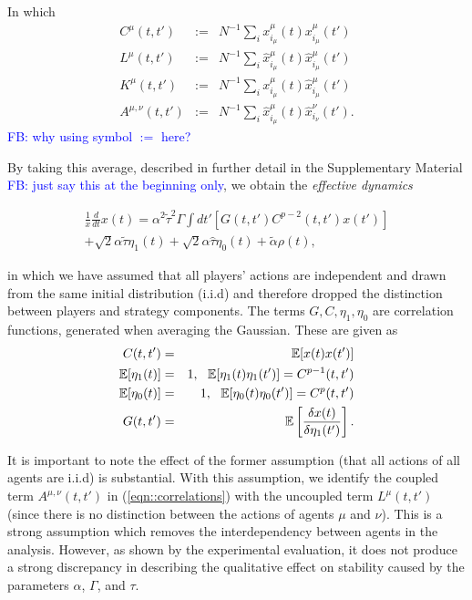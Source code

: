 \documentclass[sigconf,anonymous]{aamas}
\newcommand{\xmu}[2]{x_{#1_#2}^{#2}(t)}
\newcommand{\xmudash}[2]{x_{#1_#2}^{#2}(t')}
\newcommand{\hxmu}[1]{\hat{x}_{#1_\mu}^{\mu} (t)}
\newcommand{\hxmudash}[1]{\hat{x}_{#1_\mu}^{\mu} (t')}
\newcommand{\hxnudash}[1]{\hat{x}_{#1_\nu}^{\nu} (t')}
\newcommand{\talpha}{\tilde{\alpha}}
\newcommand{\ttau}{\tilde{\tau}}
\newcommand{\htau}{\hat{\tau}}
\newcommand\fb[1]{\textcolor{blue}{FB: #1}}
\begin{document}
In which
%
\begin{eqnarray*}
\label{eqn::correlations}
        C^\mu (t, t') &  := & N^{-1} \sum_i \xmu{i}{\mu} \xmudash{i}{\mu} \\
        L^\mu (t, t') & :=  & N^{-1} \sum_i \hxmu{i} \hxmudash{i} \\
        K^\mu (t, t') & :=  & N^{-1} \sum_i \xmu{i}{\mu} \hxmudash{i} \\
        A^{\mu, \nu} (t, t') & := &  N^{-1} \sum_i \hxmu{i} \hxnudash{i}.
\end{eqnarray*}
\fb{why using symbol $:=$ here?}

By taking this average, described in further detail in the Supplementary Material \fb{just say this at the beginning only}, we obtain the \textit{effective dynamics}

\begin{equation}
    \label{eqn::EffectiveDynamics}
    \begin{split}
            \frac{1}{x} \frac{d}{dt} x(t) = \alpha^2 \ttau^2 \Gamma \int dt' \left [G(t, t')C^{p - 2}(t, t') x(t') \right ]\\ + \sqrt{2} \alpha \ttau \eta_1(t) + \sqrt{2} \alpha \htau \eta_0(t) + \talpha \rho(t), 
    \end{split}
\end{equation}

in which we have assumed that all players' actions are independent and drawn from the same initial distribution (i.i.d)
and therefore dropped the distinction between players and strategy components. The terms $G, C, \eta_1, \eta_0$ are correlation functions, generated when averaging the Gaussian. These are given as 
%
\begin{eqnarray*}
        C(t, t') & = & \mathbb{E}[x(t) x(t')] \\
        \mathbb{E}[\eta_1(t)] & = & 1, \text{ \space } \mathbb{E}[\eta_1(t) \eta_1(t')]  =  C^{p-1}(t, t') \\
        \mathbb{E}[\eta_0(t)] & = & 1, \text{ \space } \mathbb{E}[\eta_0(t) \eta_0(t')] = C^{p}(t, t') \\
        G(t, t') & = & \mathbb{E}\left [ \frac{\delta x(t)}{ \delta \eta_1(t')} \right].
\end{eqnarray*}

It is important to note the effect of the former assumption (that all
actions of all agents are i.i.d) is substantial. With this assumption,
we identify the coupled term $A^{\mu, \nu} (t, t')$ in
(\ref{eqn::correlations}) with the uncoupled term $L^\mu (t, t')$
(since there is no distinction between the actions of agents $\mu$ and
$\nu$). This is a strong assumption which removes the interdependency
between agents in the analysis. However, as shown by the experimental
evaluation, it does not produce a strong discrepancy in describing the
qualitative effect on stability caused by the parameters $\alpha$,
$\Gamma$, and $\tau$.
\end{document}
